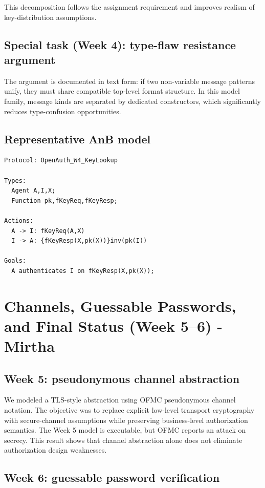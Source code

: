 \documentclass[11pt,a4paper]{article}
\begin{document}
This decomposition follows the assignment requirement and improves realism of key-distribution assumptions.

\subsection{Special task (Week 4): type-flaw resistance argument}

The argument is documented in text form: if two non-variable message patterns unify,
they must share compatible top-level format structure.
In this model family, message kinds are separated by dedicated constructors,
which significantly reduces type-confusion opportunities.

\subsection{Representative AnB model}
\begin{lstlisting}
Protocol: OpenAuth_W4_KeyLookup

Types:
  Agent A,I,X;
  Function pk,fKeyReq,fKeyResp;

Actions:
  A -> I: fKeyReq(A,X)
  I -> A: {fKeyResp(X,pk(X))}inv(pk(I))

Goals:
  A authenticates I on fKeyResp(X,pk(X));
\end{lstlisting}

\newpage
\section{Channels, Guessable Passwords, and Final Status (Week 5--6) - Mirtha}

\subsection{Week 5: pseudonymous channel abstraction}

We modeled a TLS-style abstraction using OFMC pseudonymous channel notation.
The objective was to replace explicit low-level transport cryptography with secure-channel assumptions while preserving business-level authorization semantics.
The Week 5 model is executable, but OFMC reports an attack on secrecy.
This result shows that channel abstraction alone does not eliminate authorization design weaknesses.

\subsection{Week 6: guessable password verification}
\end{document}
